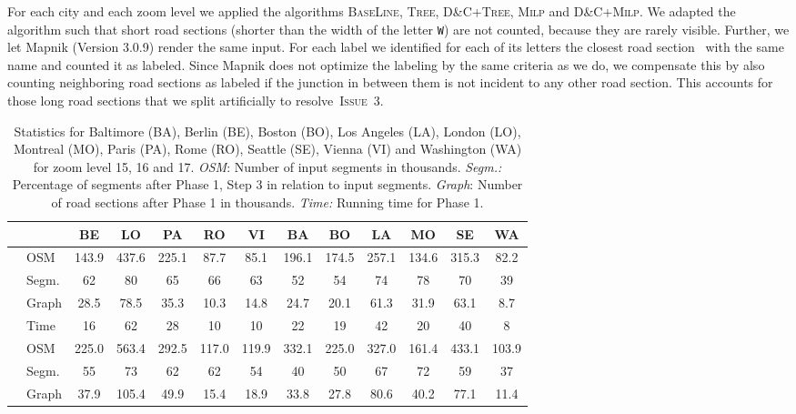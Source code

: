 \documentclass[a4paper,11pt]{article}
\newcommand{\ILong}{\textsc{Issue~3}\xspace}
\newcommand{\GreedyAlgo}{\textsc{Base\-Line}\xspace}
\newcommand{\TreeAlgo}{\textsc{Tree}\xspace}
\newcommand{\ILPAlgo}{\textsc{Milp}\xspace}
\newcommand{\Shredder}{\textsc{D\&C}}
\begin{document}
For each city and each zoom level we applied the algorithms
\GreedyAlgo, \TreeAlgo, \Shredder+\TreeAlgo, \ILPAlgo and
\Shredder+\ILPAlgo. We adapted the algorithm such that short road
sections (shorter than the width of the letter \texttt{W}) are not
counted, because they are rarely
visible. Further, we let Mapnik (Version 3.0.9) render the same
input. For each label we identified for each of its letters the
closest road section~ with the same name and counted it as
labeled. Since Mapnik does not optimize the labeling by the same
criteria as we do, we compensate this by also counting neighboring road sections as labeled if the junction in between them is not incident to any other road section. This accounts for those long road sections that we split artificially to resolve~\ILong.


\begin{table}[t]
  \caption{Statistics for Baltimore (BA), Berlin (BE), Boston (BO), Los Angeles (LA), London (LO), Montreal (MO),   Paris (PA), Rome (RO), Seattle (SE), Vienna (VI) and Washington (WA) for zoom level 15, 16 and 17. \emph{OSM}: Number of input segments in thousands. \emph{Segm.:} Percentage of segments after Phase 1, Step 3 in relation to input segments.
    \emph{Graph}: Number of road sections after Phase 1 in thousands. \emph{Time:} Running time for Phase 1.
  }
\label{table:instances16}
\label{table:instances15}
\label{table:instances17}
\centering
\small
\begin{tabular}{llccccccccccc}
\toprule
 && BE & LO & PA & RO & VI & BA & BO & LA & MO & SE & WA \\
\midrule
 \parbox[t]{3mm}{} &OSM & 143.9 & 437.6 & 225.1 & 87.7 & 85.1 & 196.1 & 174.5 & 257.1 & 134.6 & 315.3 & 82.2\\
&Segm.& 62 & 80 & 65 & 66 & 63 & 52 & 54 & 74 & 78 & 70 & 39\\
&Graph & 28.5 & 78.5 & 35.3 & 10.3 & 14.8 & 24.7 & 20.1 & 61.3 & 31.9 & 63.1 & 8.7\\
&Time & 16 & 62 & 28 & 10 & 10 & 22 & 19 & 42 & 20 & 40 & 8\\
\midrule
\parbox[t]{3mm}{}
&OSM & 225.0 & 563.4 & 292.5 & 117.0 & 119.9 & 332.1 & 225.0 & 327.0 & 161.4 & 433.1 & 103.9\\
&Segm. & 55 & 73 & 62 & 62 & 54 & 40 & 50 & 67 & 72 & 59 & 37\\
&Graph & 37.9 & 105.4 & 49.9 & 15.4 & 18.9 & 33.8 & 27.8 & 80.6 & 40.2 & 77.1 & 11.4\\

\end{tabular}
\end{table}
\end{document}
